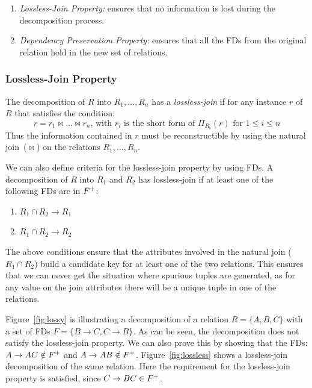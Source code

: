 \begin{enumerate}
  \item \textit{Lossless-Join Property:} ensures that no information is lost during the decomposition process.
  \item \textit{Dependency Preservation Property:} ensures that all the FDs from the original relation hold in the new set of relations. 
\end{enumerate}

\subsubsection{Lossless-Join Property}
The decomposition of $R$ into $R_1,...,R_n$ has a \textit{lossless-join} if for
any instance $r$ of $R$ that satisfies the condition: 
\[
r = r_1 \Join ... \Join r_n \mbox{, with } r_i \mbox{ is the short form of } \Pi_{R_{i}} (r) \mbox{ for } 1 \leq i \leq n
\] 
Thus the information contained in $r$ must be reconstructible by using the natural join~($\Join$) on the relations $R_1,...,R_n$. 

We can also define criteria for the lossless-join property by using FDs. 
A decomposition of $R$ into $R_1$ and $R_2$ has lossless-join
if at least one of the following FDs are in $F\sp{+}$:
\begin{enumerate}
  \item $R_1 \cap R_2 \rightarrow R_1 $ 
  \item $R_1 \cap R_2 \rightarrow R_2 $
\end{enumerate}

The above conditions ensure that the attributes involved in the natural join 
($R_1 \cap R_2$) build a candidate key for at least one of the two relations. This ensures that 
we can never get the situation where spurious tuples are generated, as for any 
value on the join attributes there will be a unique tuple in one of the relations. 

Figure~\ref{fig:lossy} is illustrating a decomposition of a relation $R = \{A, B, C \}$ with
a set of FDs $F = \{B \rightarrow C, C \rightarrow B\}$. As can be seen, the decomposition does
not satisfy the lossless-join property. We can also prove this by showing that the FDs: 
$A \rightarrow AC \notin F\sp{+}$ and $A \rightarrow AB \notin F\sp{+}$.
Figure~\ref{fig:lossless} shows
a lossless-join decomposition of the same relation. Here the requirement for the 
lossless-join property is satisfied,
since $C \rightarrow BC \in F\sp{+}$.

